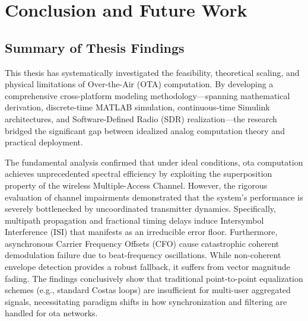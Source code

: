 \documentclass[Markos_Delaportas_1316.tex]{subfiles}
\begin{document}
\section{Conclusion and Future Work}

\subsection{Summary of Thesis Findings}
This thesis has systematically investigated the feasibility,
theoretical scaling, and physical
limitations of Over-the-Air (OTA) computation. By developing a
comprehensive cross-platform
modeling methodology---spanning mathematical derivation,
discrete-time MATLAB simulation,
continuous-time Simulink architectures, and Software-Defined Radio
(SDR) realization---the
research bridged the significant gap between idealized analog
computation theory and practical
deployment.

The fundamental analysis confirmed that under ideal conditions,
\gls{ota} computation achieves
unprecedented spectral efficiency by exploiting the superposition
property of the wireless
Multiple-Access Channel. However, the rigorous evaluation of channel
impairments demonstrated
that the system's performance is severely bottlenecked by
uncoordinated transmitter dynamics.
Specifically, multipath propagation and fractional timing delays
induce Intersymbol Interference
(ISI) that manifests as an irreducible error floor. Furthermore,
asynchronous Carrier Frequency
Offsets (CFO) cause catastrophic coherent demodulation failure due to
beat-frequency oscillations.
While non-coherent envelope detection provides a robust fallback, it
suffers from vector magnitude
fading. The findings conclusively show that traditional
point-to-point equalization schemes (e.g.,
standard Costas loops) are insufficient for multi-user aggregated
signals, necessitating paradigm
shifts in how synchronization and filtering are handled for \gls{ota} networks.
\end{document}
